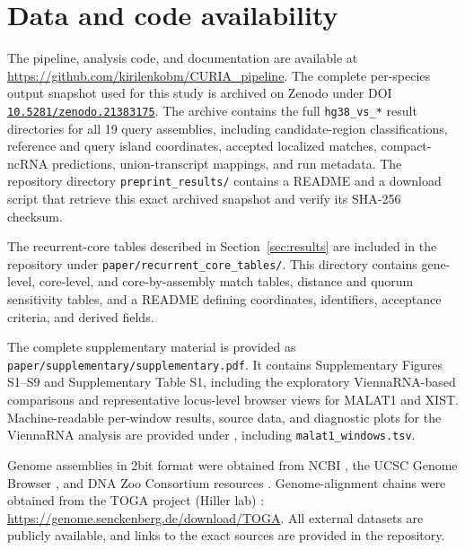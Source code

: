 \section{Data and code availability}
\label{sec:availability}

The \curia{} pipeline, analysis code, and documentation are available at
\url{https://github.com/kirilenkobm/CURIA_pipeline}. The complete per-species
output snapshot used for this study is archived on Zenodo
\citep{curiaZenodo2026} under DOI
\href{https://doi.org/10.5281/zenodo.21383175}
{\texttt{10.5281/zenodo.21383175}}. The archive contains the full
\texttt{hg38\_vs\_*} result directories for all 19 query assemblies, including
candidate-region classifications, reference and query island coordinates,
accepted localized matches, compact-ncRNA predictions, union-transcript
mappings, and run metadata. The repository directory
\texttt{preprint\_results/} contains a README and a download script that retrieve
this exact archived snapshot and verify its SHA-256 checksum.

The recurrent-core tables described in Section~\ref{sec:results} are included in
the repository under \texttt{paper/recurrent\_core\_tables/}. This directory
contains gene-level, core-level, and core-by-assembly match tables, distance and
quorum sensitivity tables, and a README defining coordinates, identifiers,
acceptance criteria, and derived fields.

The complete supplementary material is provided as
\texttt{paper/supplementary/supplementary.pdf}. It contains Supplementary
Figures S1--S9 and Supplementary Table S1, including the exploratory
ViennaRNA-based comparisons and representative locus-level browser views for
MALAT1 and XIST. Machine-readable per-window results, source data, and diagnostic
plots for the ViennaRNA analysis are provided under
, including
\texttt{malat1\_windows.tsv}.

Genome assemblies in 2bit format were obtained from NCBI
\citep{sayersDatabaseResourcesNational2022}, the UCSC Genome Browser
\citep{kentHumanGenomeBrowser2002}, and DNA Zoo Consortium resources
\citep{dudchenkoDeNovoAssembly2017}. Genome-alignment chains were obtained from
the TOGA project (Hiller lab)
\citep{kirilenkoIntegratingGeneAnnotation2023}:
\url{https://genome.senckenberg.de/download/TOGA}. All external datasets are
publicly available, and links to the exact sources are provided in the
repository.